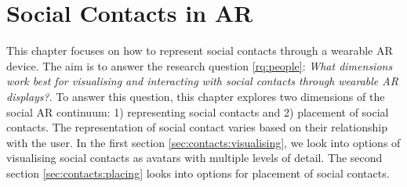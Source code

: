 \chapter{Social Contacts in AR}
\label{ch:contacts} 

This chapter focuses on how to represent social contacts through a wearable AR device. The aim is to answer the research question \ref{rq:people}: \textit{What dimensions work best for visualising and interacting with social contacts through wearable AR displays?}. To answer this question, this chapter explores two dimensions of the social AR continuum: 1) representing social contacts and 2) placement of social contacts. The representation of social contact varies based on their relationship with the user. 
In the first section \ref{sec:contacts:visualising}, we look into options of visualising social contacts as avatars with multiple levels of detail. The second section \ref{sec:contacts:placing} looks into options for placement of social contacts. 





